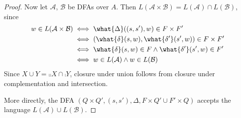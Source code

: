 \begin{proof}
    Now let $\mathcal{A}$, $\mathcal{B}$ be DFAs over $A$.
    Then $L(\mathcal{A} \times \mathcal{B})
    = L(\mathcal{A}) \cap L(\mathcal{B})$, since
    \begin{align*}
        w \in L(\mathcal{A} \times \mathcal{B})
            &\iff \what{\Delta}((s, s'), w) \in F \times F' \\
            &\iff (\what{\delta}(s, w), \what{\delta'}(s', w)) \in F \times F' \\
            &\iff \what{\delta}(s, w) \in F \land \what{\delta'}(s', w) \in F' \\
            &\iff w \in L(\mathcal{A}) \land w \in L(\mathcal{B})
    \end{align*}
    Since $X \cup Y = \comp{\comp{X} \cap \comp{Y}}$, closure under union
    follows from closure under complementation and intersection.

    More directly, the DFA
    $(Q \times Q', (s, s'), \Delta, F \times Q' \cup F' \times Q)$
    accepts the language $L(\mathcal{A}) \cup L(\mathcal{B})$.
\end{proof}
